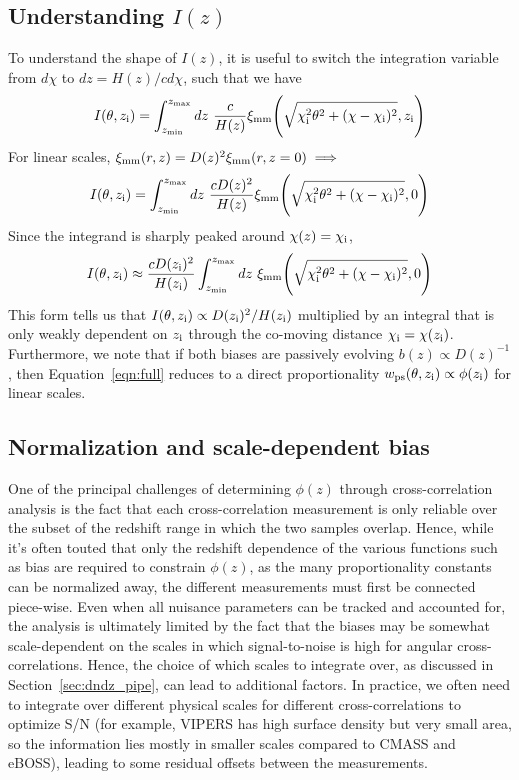 \subsection{Understanding $I(z)$}
To understand the shape of $I(z)$, it is useful to switch the integration variable from $d\chi$ to $dz = H(z)/c d\chi$, such that we have
%
\begin{equation}\label{defn_I_z}
    I(\theta, z_{\rm i}) = \int_{z_{\rm min}}^{z_{\rm max}}dz \ \frac{c}{H(z)}\xi_{\rm mm}{\Bigg (}\sqrt{\chi_{\rm i}^2\theta^2 + (\chi-\chi_{\rm i})^2},z_{\rm i}{\Bigg )}
\end{equation}
%
For linear scales, $\xi_{\rm mm}(r,z) = D(z)^2 \xi_{\rm mm}(r,z=0) \implies$
\begin{align}\label{linear_growth}
    I(\theta, z_{\rm i}) = \int_{z_{\rm min}}^{z_{\rm max}}dz \ \frac{cD(z)^2}{H(z)}\xi_{\rm mm}{\Bigg (}\sqrt{\chi_{\rm i}^2\theta^2 + (\chi-\chi_{\rm i})^2},0{\Bigg )}
\end{align}
%
Since the integrand is sharply peaked around $\chi(z) = \chi_{\rm i}$,
%
\begin{equation}
    I(\theta, z_{\rm i}) \approx \frac{cD(z_{\rm i})^2}{H(z_{\rm i})} \int_{z_{\rm min}}^{z_{\rm max}}dz \ \xi_{\rm mm}{\Bigg (}\sqrt{\chi_{\rm i}^2\theta^2 + (\chi-\chi_{\rm i})^2},0{\Bigg )}
\end{equation}
%
This form tells us that $I(\theta, z_{\rm i}) \propto D(z_{\rm i})^2/H(z_{\rm i})$ multiplied by an integral that is only weakly dependent on $z_{\rm i}$ through the co-moving distance $\chi_{\rm i} = \chi(z_{\rm i})$. Furthermore, we note that if both biases are passively evolving $b(z) \propto D(z)^{-1}$, then Equation~\ref{eqn:full} reduces to a direct proportionality $w_{\rm ps}(\theta, z_{\rm i}) \propto \phi(z_{\rm i})$ for linear scales.

\subsection{Normalization and scale-dependent bias}

One of the principal challenges of determining $\phi(z)$ through cross-correlation analysis is the fact that each cross-correlation measurement is only reliable over the subset of the redshift range in which the two samples overlap. Hence, while it's often touted that only the redshift dependence of the various functions such as bias are required to constrain $\phi(z)$, as the many proportionality constants can be normalized away, the different measurements must first be connected piece-wise. Even when all nuisance parameters can be tracked and accounted for, the analysis is ultimately limited by the fact that the biases may be somewhat scale-dependent on the scales in which signal-to-noise is high for angular cross-correlations. Hence, the choice of which scales to integrate over, as discussed in Section~\ref{sec:dndz_pipe}, can lead to additional factors. In practice, we often need to integrate over different physical scales for different cross-correlations to optimize S/N (for example, VIPERS has high surface density but very small area, so the information lies mostly in smaller scales compared to CMASS and eBOSS), leading to some residual offsets between the measurements.

